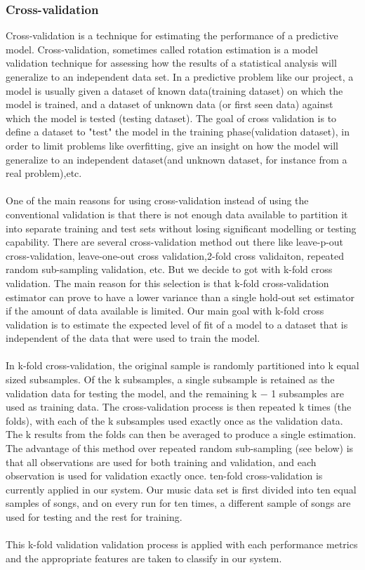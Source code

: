 \subsubsection{Cross-validation}
Cross-validation is a technique for estimating the performance of a predictive model.
Cross-validation, sometimes called rotation estimation is a model validation technique for assessing how the
results of a statistical analysis will generalize to an independent data set. In a predictive problem like our project, a model is usually given a dataset of known data(training dataset) on which 
the model is trained, and a dataset of unknown data (or first seen data) against which the model is tested (testing dataset). The goal of cross validation is to define a dataset
to "test" the model in the training phase(validation dataset), in order to limit problems like overfitting, give an insight on how the model will generalize to an independent dataset(and unknown dataset, for instance from 
a real problem),etc.\\
\\
One of the main reasons for using cross-validation instead of using the conventional validation is that there is not enough data available to partition it into separate training and test sets without losing
significant modelling or testing capability. There are several cross-validation method out there like leave-p-out cross-validation, leave-one-out cross validation,2-fold cross validaiton, repeated random 
sub-sampling validation, etc. But we decide to got with k-fold cross validation. The main reason for this selection is that k-fold cross-validation estimator can prove to have a lower variance than a single hold-out set 
estimator if the amount of data available is limited. Our main goal with k-fold cross validation is to estimate the expected level of fit of a model to a dataset that is independent of the data that were
used to train the model.\\
\\
In k-fold cross-validation, the original sample is randomly partitioned into k equal sized subsamples. Of the k subsamples,
a single subsample is retained as the validation data for testing the model, and the remaining k − 1 subsamples are used as training
data. The cross-validation process is then repeated k times (the folds), with each of the k subsamples used exactly once as the validation data. The k results from the
folds can then be averaged to produce a single estimation. The advantage of this method over repeated random sub-sampling (see below) is that all
observations are used for both training and validation, and each observation is used for validation exactly once. ten-fold cross-validation is currently
applied in our system. Our music data set is first divided into ten equal samples of songs, and on every run for ten times, a different sample of songs are used for
testing and the rest for training.\\
\\
This k-fold validation validation process is applied with each performance metrics and the appropriate features are taken to classify in our system.


